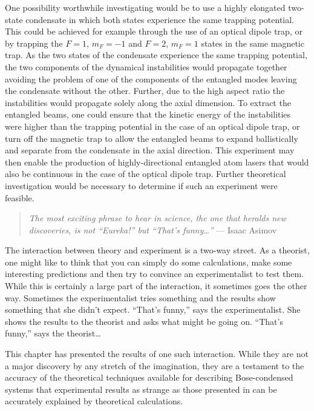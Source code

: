 One possibility worthwhile investigating would be to use a highly elongated two-state condensate in which both states experience the same trapping potential.  This could be achieved for example through the use of an optical dipole trap, or by trapping the $F=1$, $m_F=-1$ and $F=2$, $m_F=1$  states in the same magnetic trap.  As the two states of the condensate experience the same trapping potential, the two components of the dynamical instabilities would propagate together avoiding the problem of one of the components of the entangled modes leaving the condensate without the other.  Further, due to the high aspect ratio the instabilities would propagate solely along the axial dimension.  To extract the entangled beams, one could ensure that the kinetic energy of the instabilities were higher than the trapping potential in the case of an optical dipole trap, or turn off the magnetic trap to allow the entangled beams to expand ballistically and separate from the condensate in the axial direction.  This experiment may then enable the production of highly-directional entangled atom lasers that would also be continuous in the case of the optical dipole trap.  Further theoretical investigation would be necessary to determine if such an experiment were feasible.

\parasep

\begin{quote}
    \emph{The most exciting phrase to hear in science, the one that heralds new discoveries, is not ``Eureka!'' but ``That's funny\dots''} --- Isaac Asimov
\end{quote}

The interaction between theory and experiment is a two-way street.  As a theorist, one might like to think that you can simply do some calculations, make some interesting predictions and then try to convince an experimentalist to test them.  While this is certainly a large part of the interaction, it sometimes goes the other way.  Sometimes the experimentalist tries something and the results show something that she didn't expect. ``That's funny,'' says the experimentalist.  She shows the results to the theorist and asks what might be going on.  ``That's funny,'' says the theorist\dots

This chapter has presented the results of one such interaction.  While they are not a major discovery by any stretch of the imagination, they are a testament to the accuracy of the theoretical techniques available for describing Bose-condensed systems that experimental results as strange as those presented in  can be accurately explained by theoretical calculations.


